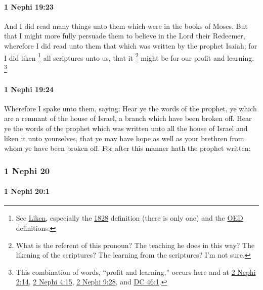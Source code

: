 		\paragraph{1 Nephi 19:23} %
			\label{1NEPHI-19-23}

			And I did read many things unto them which were in the books of Moses.
			But that I might more fully persuade them to believe in the Lord their Redeemer,
			wherefore I did read unto them that which was written by the prophet Isaiah;
			for I did liken%
				\footnote{%
					\label{1NEPHI-19-23-NOTE-liken}%
					See \hyperref[LIKEN]{Liken}, especially the \hyperref[LIKEN-1828]{1828} definition (there is only one) and the \hyperref[LIKEN-OED]{OED} definitions.
					}
			all scriptures unto us,
			that it%
				\footnote{%
					\label{1NEPHI-19-23-NOTE-it}%
					What is the referent of this pronoun? The teaching he does in this way? The likening of the scriptures? The learning from the scriptures? I'm not sure.
					}
			might be for our profit and learning.%
				\footnote{%
					This combination of words, ``profit and learning,'' occurs here and at \hyperref[2NEPHI-2-14]{2 Nephi 2:14}, \hyperref[2NEPHI-4-15]{2 Nephi 4:15}, \hyperref[2NEPHI-9-28]{2 Nephi 9:28}, and \hyperref[DC46-1]{DC 46:1}.
					}

		\paragraph{1 Nephi 19:24} %
			\label{1NEPHI-19-24}

			Wherefore I spake unto them, saying:
			Hear ye the words of the prophet,
			ye which are a remnant of the house of Israel,
			a branch which have been broken off.
			Hear ye the words of the prophet
			which was written unto all the house of Israel
			and liken it unto yourselves,
			that ye may have hope as well as your brethren
			from whom ye have been broken off.
			For after this manner hath the prophet written:

	\subsubsection{1 Nephi 20} %
		\label{1NEPHI-20} 
		
		\paragraph{1 Nephi 20:1} %
			\label{1NEPHI-20-1}

